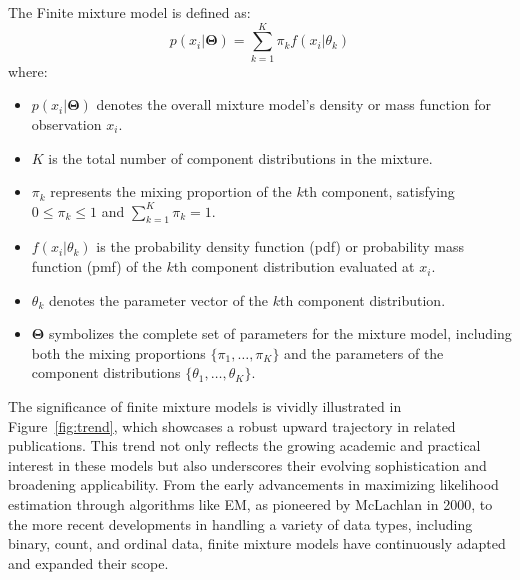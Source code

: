 \documentclass{article}
\begin{document}
The Finite mixture model is defined as:
\begin{equation}
p(x_i|\mathbf{\Theta}) = \sum_{k=1}^{K} \pi_k f(x_i|\theta_k)
\end{equation}
where:
\begin{itemize}
    \item $p(x_i|\mathbf{\Theta})$ denotes the overall mixture model's density or mass function for observation $x_i$.
    \item $K$ is the total number of component distributions in the mixture.
    \item $\pi_k$ represents the mixing proportion of the $k$th component, satisfying $0 \leq \pi_k \leq 1$ and $\sum_{k=1}^{K} \pi_k = 1$.
    \item $f(x_i|\theta_k)$ is the probability density function (pdf) or probability mass function (pmf) of the $k$th component distribution evaluated at $x_i$.
    \item $\theta_k$ denotes the parameter vector of the $k$th component distribution.
    \item $\mathbf{\Theta}$ symbolizes the complete set of parameters for the mixture model, including both the mixing proportions $\{\pi_1, \ldots, \pi_K\}$ and the parameters of the component distributions $\{\theta_1, \ldots, \theta_K\}$.
\end{itemize}

The significance of finite mixture models is vividly illustrated in Figure~\ref{fig:trend}, which showcases a robust upward trajectory in related publications. This trend not only reflects the growing academic and practical interest in these models but also underscores their evolving sophistication and broadening applicability. From the early advancements in maximizing likelihood estimation through algorithms like EM, as pioneered by McLachlan in 2000, to the more recent developments in handling a variety of data types, including binary, count, and ordinal data, finite mixture models have continuously adapted and expanded their scope.
\end{document}
